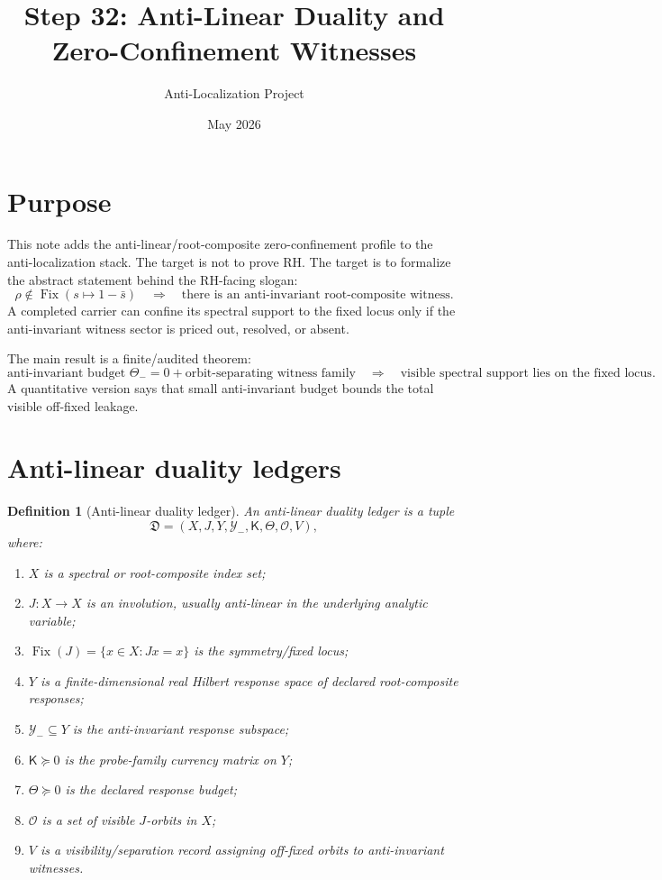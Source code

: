 \documentclass[11pt]{article}
\title{Step 32: Anti-Linear Duality and Zero-Confinement Witnesses}
\author{Anti-Localization Project}
\date{May 2026}
\newtheorem{definition}[theorem]{Definition}
\newcommand{\Kmat}{\mathsf K}
\newcommand{\ThetaB}{\mathsf\Theta}
\newcommand{\Fix}{\operatorname{Fix}}
\begin{document}
\maketitle

\section{Purpose}

This note adds the anti-linear/root-composite zero-confinement profile to the anti-localization stack.
The target is not to prove RH.  The target is to formalize the abstract statement behind the RH-facing slogan:
\[
\rho\notin \Fix(s\mapsto 1-\bar s)
\quad\Longrightarrow\quad
\text{there is an anti-invariant root-composite witness.}
\]
A completed carrier can confine its spectral support to the fixed locus only if the anti-invariant witness sector is priced out, resolved, or absent.

The main result is a finite/audited theorem:
\[
\text{anti-invariant budget }\Theta_- = 0
+
\text{orbit-separating witness family}
\quad\Longrightarrow\quad
\text{visible spectral support lies on the fixed locus.}
\]
A quantitative version says that small anti-invariant budget bounds the total visible off-fixed leakage.

\section{Anti-linear duality ledgers}

\begin{definition}[Anti-linear duality ledger]
An anti-linear duality ledger is a tuple
\[
\mathfrak D=(X,J,Y,\mathcal Y_-,\Kmat,\ThetaB,\mathcal O,V),
\]
where:
\begin{enumerate}[label=(\roman*)]
\item $X$ is a spectral or root-composite index set;
\item $J:X\to X$ is an involution, usually anti-linear in the underlying analytic variable;
\item $\Fix(J)=\{x\in X:Jx=x\}$ is the symmetry/fixed locus;
\item $Y$ is a finite-dimensional real Hilbert response space of declared root-composite responses;
\item $\mathcal Y_-\subseteq Y$ is the anti-invariant response subspace;
\item $\Kmat\succeq0$ is the probe-family currency matrix on $Y$;
\item $\ThetaB\succeq0$ is the declared response budget;
\item $\mathcal O$ is a set of visible $J$-orbits in $X$;
\item $V$ is a visibility/separation record assigning off-fixed orbits to anti-invariant witnesses.
\end{enumerate}
\end{definition}
\end{document}
